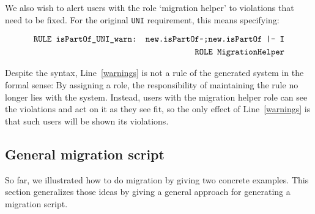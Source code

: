 \documentclass[runningheads]{llncs}
\begin{document}
   We also wish to alert users with the role `migration helper' to violations that need to be fixed.
   For the original \verb=UNI= requirement, this means specifying:
   
\begin{align}
   \begin{aligned}
   \text{\tt RULE isPartOf\_UNI\_warn: new.isPartOf\textasciitilde;new.isPartOf |- I}\\
   \quad\text{\tt ROLE MigrationHelper}
   \end{aligned}\label{warnings}
\end{align}
   
   Despite the syntax, Line~{\ref{warnings}} is not a rule of the generated system in the formal sense:
   By assigning a role, the responsibility of maintaining the rule no longer lies with the system.
   Instead, users with the migration helper role can see the violations and act on it as they see fit, so the only effect of Line~{\ref{warnings}} is that such users will be shown its violations.

\subsection{General migration script}\label{General migration script}
   So far, we illustrated how to do migration by giving two concrete examples.
   This section generalizes those ideas by giving a general approach for generating a migration script.
   
\end{document}
